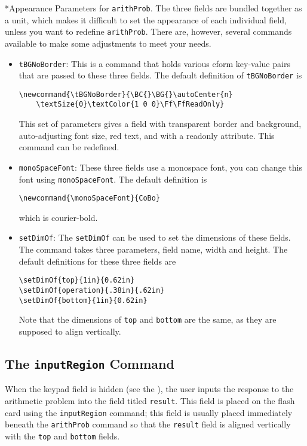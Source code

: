 \documentclass{article}
\makeatletter
\let\bslash=\@backslashchar
\renewcommand{\paragraph}{\@startsection{paragraph}{4}{0pt}{6pt}{-3pt}{\bfseries}}
\def\cs#1{\texttt{\bslash#1}}
\makeatother
\begin{document}
\paragraph*{Appearance Parameters for \cs{arithProb}.} The three fields are
bundled together as a unit, which makes it difficult to set the appearance of
each individual field, unless you want to redefine \cs{arithProb}. There are,
however, several commands available to make some adjustments to meet your
needs.
\begin{itemize}
    \item \cs{tBGNoBorder}: This is a command that holds various
        \textsf{eform} key-value pairs that are passed to these three
        fields. The default definition of \cs{tBGNoBorder} is
\begin{Verbatim}[xleftmargin=\amtIndent]
\newcommand{\tBGNoBorder}{\BC{}\BG{}\autoCenter{n}
    \textSize{0}\textColor{1 0 0}\Ff\FfReadOnly}
\end{Verbatim}
    This set of parameters gives a field with transparent border and
    background, auto-adjusting font size, red text, and with a readonly
    attribute. This command can be redefined.
    \item \cs{monoSpaceFont}: These three fields use a monospace font, you
        can change this font using \cs{monoSpaceFont}. The default
        definition is
\begin{Verbatim}[xleftmargin=\amtIndent]
\newcommand{\monoSpaceFont}{CoBo}
\end{Verbatim}
    which is courier-bold.
    \item \cs{setDimOf}: The \cs{setDimOf} can be used to set the
        dimensions of these fields. The command takes three parameters,
        field name, width and height. The default definitions for these
        three fields are
\begin{Verbatim}[xleftmargin=\amtIndent]
\setDimOf{top}{1in}{0.62in}
\setDimOf{operation}{.38in}{.62in}
\setDimOf{bottom}{1in}{0.62in}
\end{Verbatim}
Note that the dimensions of \texttt{top} and \texttt{bottom} are the same,
as they are supposed to align vertically.
\end{itemize}

\subsection{The \texorpdfstring{\protect\cs{inputRegion}} {} Command}

When the keypad field is hidden (see the ), the user inputs
the response to the arithmetic problem into the field titled \texttt{result}.
This field is placed on the flash card using the \cs{inputRegion} command;
this field is usually placed immediately beneath the \cs{arithProb} command
so that the \texttt{result} field is aligned vertically with the \texttt{top}
and \texttt{bottom} fields.
\end{document}
